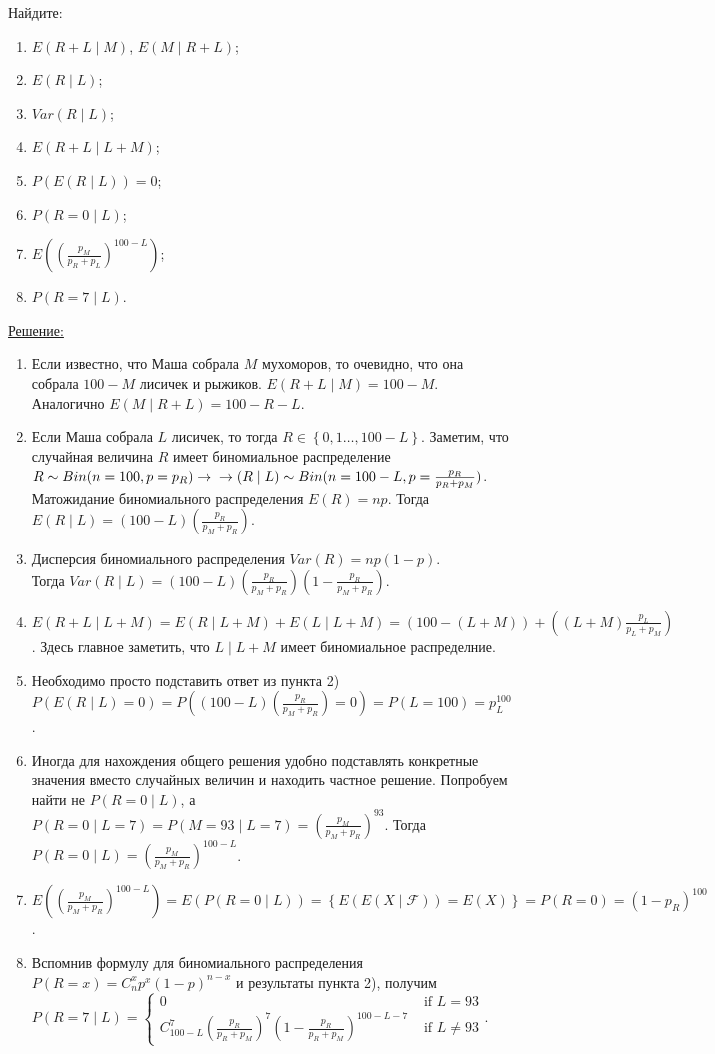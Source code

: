 \documentclass[a4paper]{article}
\begin{document}
 Найдите:
\begin{enumerate}
	\item $E(R+L \mid M)$, $E(M \mid R+L)$;
	\item $E(R \mid L)$;
	\item $Var(R \mid L)$;
	\item $E(R+L \mid L+M)$;
	\item $P(E(R \mid L))=0$;
	\item $P(R=0 \mid L)$;
	\item $E((\frac{p_{M}}{p_{R}+p_{L}})^{100-L})$;
	\item $P(R=7\mid L)$.
\end{enumerate}
\par{\underline{Решение:}}
\begin{enumerate}
	\item Если известно, что Маша собрала $M$ мухоморов, то очевидно, что она собрала $100 - M$ лисичек и рыжиков. $E(R+L \mid M) = 100 - M$.
	Аналогично $E(M \mid R+L) = 100 - R - L$.
	\item Если Маша собрала $L$ лисичек, то тогда $R\in \left \{0, 1\ldots, 100 - L  \right \}$. Заметим, что случайная величина $R$ имеет биномиальное распределение $R \sim Bin(n=100, p =p_{R}) \rightarrow \\ \rightarrow (R\mid L) \sim Bin(n =100-L,p =\frac{p_{R}}{p_{R}+p_{M}})$. \\ Матожидание биномиального распределения $E(R) = np$. Тогда $E(R \mid L) = (100-L)(\frac{p_{R}}{p_{M}+p_{R}})$.
	\item Дисперсия биномиального распределения $Var(R) = np(1-p)$. \\ Тогда $Var(R\mid L)=(100-L)(\frac{p_{R}}{p_{M}+p_{R}})(1-\frac{p_{R}}{p_{M}+p_{R}})$.
	\item $E(R+L\mid L+M) = E(R\mid L+M) + E(L\mid L +M) = (100-(L+M)) + ((L+M)\frac{p_{L}}{p_{L}+p_{M}})$. Здесь главное заметить, что $L\mid L +M$ имеет биномиальное распределние.
	\item Необходимо просто подставить ответ из пункта 2) \\ $P(E(R\mid L)=0) = P((100-L)(\frac{p_{R}}{p_{M}+p_{R}})=0) = P(L=100) =p_{L}^{100}$.
	\item Иногда для нахождения общего решения удобно подставлять конкретные значения вместо случайных величин и находить частное решение. Попробуем найти не $P(R=0\mid L)$,  а \\ $P(R=0\mid L=7) = P(M=93\mid L=7) = (\frac{p_{M}}{p_{M}+p_{R}})^{93}$. Тогда $P(R=0\mid L) = (\frac{p_{M}}{p_{M}+p_{R}})^{100 - L}$.
	\item $E((\frac{p_{M}}{p_{M}+p_{R}})^{100 - L})=E(P(R=0\mid L))=\left \{ E(E(X\mid \mathcal{F}))=E(X) \right \} = P(R=0)=(1-p_{R})^{100}$.
	\item Вспомнив формулу для биномиального распределения $P(R=x)=C_{n}^{x}p^{x}(1-p)^{n-x}$ и результаты пункта 2), получим $P(R=7\mid L)=\begin{cases}
	0 & \text{ if } L= 93\\
	C_{100-L}^{7}(\frac{p_{R}}{p_{R}+p_{M}})^{7}(1-\frac{p_{R}}{p_{R}+p_{M}})^{100-L-7} & \text{ if } L\neq 93 \end{cases}$.
\end{enumerate}
\end{document}
